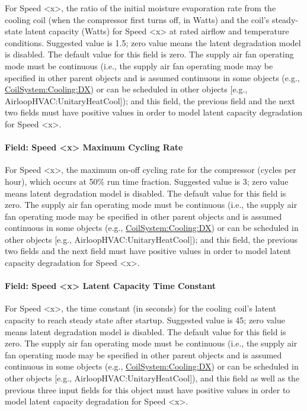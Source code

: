 For Speed \textless{}x\textgreater{}, the ratio of the initial moisture evaporation rate from the cooling coil (when the compressor first turns off, in Watts) and the coil's steady-state latent capacity (Watts) for Speed \textless{}x\textgreater{} at rated airflow and temperature conditions. Suggested value is 1.5; zero value means the latent degradation model is disabled. The default value for this field is zero. The supply air fan operating mode must be continuous (i.e., the supply air fan operating mode may be specified in other parent objects and is assumed continuous in some objects (e.g., \hyperref[coilsystemcoolingdx]{CoilSystem:Cooling:DX}) or can be scheduled in other objects {[}e.g., AirloopHVAC:UnitaryHeatCool{]}); and this field, the previous field and the next two fields must have positive values in order to model latent capacity degradation for Speed \textless{}x\textgreater{}.

\paragraph{Field: Speed \textless{}x\textgreater{} Maximum Cycling Rate}\label{field-speed-x-maximum-cycling-rate}

For Speed \textless{}x\textgreater{}, the maximum on-off cycling rate for the compressor (cycles per hour), which occurs at 50\% run time fraction. Suggested value is 3; zero value means latent degradation model is disabled. The default value for this field is zero. The supply air fan operating mode must be continuous (i.e., the supply air fan operating mode may be specified in other parent objects and is assumed continuous in some objects (e.g., \hyperref[coilsystemcoolingdx]{CoilSystem:Cooling:DX}) or can be scheduled in other objects {[}e.g., AirloopHVAC:UnitaryHeatCool{]}); and this field, the previous two fields and the next field must have positive values in order to model latent capacity degradation for Speed \textless{}x\textgreater{}.

\paragraph{Field: Speed \textless{}x\textgreater{} Latent Capacity Time Constant}\label{field-speed-x-latent-capacity-time-constant}

For Speed \textless{}x\textgreater{}, the time constant (in seconds) for the cooling coil's latent capacity to reach steady state after startup. Suggested value is 45; zero value means latent degradation model is disabled. The default value for this field is zero. The supply air fan operating mode must be continuous (i.e., the supply air fan operating mode may be specified in other parent objects and is assumed continuous in some objects (e.g., \hyperref[coilsystemcoolingdx]{CoilSystem:Cooling:DX}) or can be scheduled in other objects {[}e.g., AirloopHVAC:UnitaryHeatCool{]}), and this field as well as the previous three input fields for this object must have positive values in order to model latent capacity degradation for Speed \textless{}x\textgreater{}.

